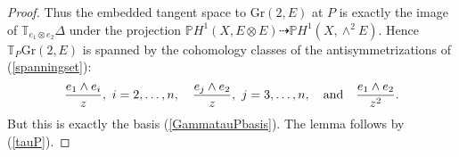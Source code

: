 \documentclass[10pt]{amsart}
\numberwithin{equation}{section}
\newcommand{\pp}{\mathbb P}
\newcommand{\cc}{\mathbb C}
\newcommand{\bt}{\mathbb T}
\newcommand{\Gr}{\mathrm{Gr}}
\newcommand{\Prin}{\mathrm{Prin}}
\begin{document}
\begin{proof}
 Thus the embedded tangent space to $\Gr(2, E)$ at $P$ is exactly the image of $\bt_{e_1 \otimes e_2} \Delta$ under the projection $\pp H^{1}(X, E \otimes E) \dashrightarrow \pp H^{1}(X, \wedge^{2}E)$. Hence $\bt_P \Gr(2, E)$ is spanned by the cohomology classes of the antisymmetrizations of (\ref{spanningset}):
\[ \frac{e_{1} \wedge e_i}{z}, \ i = 2, \ldots , n, \quad \frac{e_{j} \wedge e_2}{z}, \ j = 3, \ldots , n, \quad \hbox{and} \quad \frac{e_{1} \wedge e_2}{z^2}. \]
But this is exactly the basis (\ref{GammatauPbasis}). 
 The lemma follows by (\ref{tauP}). \end{proof}
\end{document}
